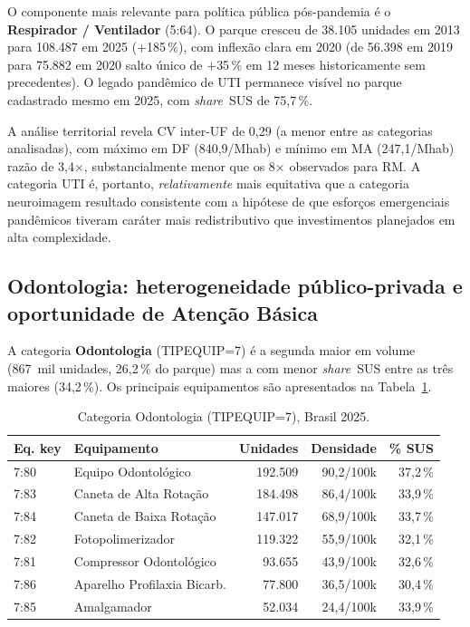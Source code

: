 \documentclass[12pt,a4paper,oneside]{article}
\begin{document}
O componente mais relevante para política pública pós-pandemia é
o \textbf{Respirador / Ventilador} (5{:}64). O parque cresceu de
38.105 unidades em 2013 para 108.487 em 2025 (+185\,\%), com
inflexão clara em 2020 (de 56.398 em 2019 para
75.882 em 2020 \textendash{} salto único de $+$35\,\% em 12 meses
historicamente sem precedentes). O legado pandêmico de UTI
permanece visível no parque cadastrado mesmo em 2025, com
\textit{share}~SUS de 75,7\,\%.

A análise territorial revela CV inter-UF de 0,29 (a menor entre as
categorias analisadas), com máximo em DF (840,9/Mhab) e mínimo em
MA (247,1/Mhab) \textemdash{} razão de 3,4$\times$, substancialmente
menor que os 8$\times$ observados para RM. A categoria UTI é,
portanto, \textit{relativamente} mais equitativa que a categoria
neuroimagem \textemdash{} resultado consistente com a hipótese de
que esforços emergenciais pandêmicos tiveram caráter mais redistributivo
que investimentos planejados em alta complexidade.

\subsection{Odontologia: heterogeneidade público-privada e
oportunidade de Atenção Básica}\label{sub:odonto}

A categoria \textbf{Odontologia} (TIPEQUIP=7) é a segunda maior
em volume (867~mil unidades, 26,2\,\% do parque) mas a com menor
\textit{share}~SUS entre as três maiores (34,2\,\%). Os principais
equipamentos são apresentados na Tabela~\ref{tab:odonto-detalhe}.

\begin{table}[htbp]
\centering
\caption{Categoria Odontologia (TIPEQUIP=7), Brasil 2025.}
\label{tab:odonto-detalhe}
\small
\begin{tabular}{l l r r r}
\toprule
\textbf{Eq. key} & \textbf{Equipamento} & \textbf{Unidades} &
\textbf{Densidade} & \textbf{\% SUS} \\
\midrule
7{:}80 & Equipo Odontológico            & 192.509 & 90,2/100k & 37,2\,\% \\
7{:}83 & Caneta de Alta Rotação         & 184.498 & 86,4/100k & 33,9\,\% \\
7{:}84 & Caneta de Baixa Rotação        & 147.017 & 68,9/100k & 33,7\,\% \\
7{:}82 & Fotopolimerizador              & 119.322 & 55,9/100k & 32,1\,\% \\
7{:}81 & Compressor Odontológico        &  93.655 & 43,9/100k & 32,6\,\% \\
7{:}86 & Aparelho Profilaxia Bicarb.    &  77.800 & 36,5/100k & 30,4\,\% \\
7{:}85 & Amalgamador                    &  52.034 & 24,4/100k & 33,9\,\% \\
\bottomrule
\end{tabular}
\end{table}
\end{document}
